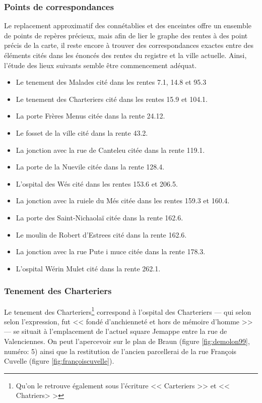 \subsubsection{Points de correspondances}
Le replacement approximatif des connétablies et des enceintes offre  un ensemble de points de repères précieux, mais afin de lier le graphe des rentes à des point précis de la carte, il reste encore à trouver des correspondances exactes entre des éléments cités dans les énoncés des rentes du registre et la ville actuelle. Ainsi, l'étude des lieux suivants semble être commencement adéquat.

\begin{itemize}
\item	Le tenement des Malades	cité dans les rentes 	7.1, 14.8 et 95.3
\item	Le tenement des Charteriers	cité dans les rentes 	15.9 et 104.1.
\item	La porte Frères Menus	citée dans la rente 	24.12.
\item	Le fosset de la ville	cité dans la rente 	43.2.
\item	La jonction avec la rue de Canteleu	citée dans la rente 	119.1.
\item	La porte de la Nuevile 	citée dans la rente	128.4.
\item	L'ospital des Wés	cité dans les rentes 	153.6 et 206.5.
\item	La jonction avec la ruiele du Més	citée dans les rentes 	159.3 et 160.4.
\item   La porte des Saint-Nichaolaï citée  dans la rente 162.6.
\item   Le moulin de Robert d'Estrees cité dans la rente 162.6.
\item	La jonction avec la rue Pute i muce	citée dans la rente	178.3.
\item	L'ospital Wérin Mulet cité dans la rente	262.1.
\end{itemize}


\subsubsection{Tenement des Charteriers}
Le tenement des Charteriers\footnote{Qu'on le retrouve également sous l'écriture << Carteriers >> et << Chatriers> >} correspond à l'ospital des Charteriers --- qui selon  selon l'expression, fut << fondé d'anchienneté et hors de mémoire d'homme >> --- se situait à l'emplacement de l'actuel square Jemappe entre la rue de Valenciennes. On peut l'apercevoir sur le plan de Braun (figure \ref{fig:demolon99}, numéro: 5) ainsi que la restitution de l'ancien parcellerai de la rue François Cuvelle (figure \ref{fig:françoiscuvelle}). 

